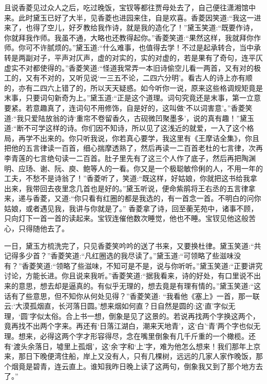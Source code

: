 \begin{parag}
    且说香菱见过众人之后，吃过晚饭，宝钗等都往贾母处去了，自己便往潇湘馆中来。此时黛玉已好了大半，见香菱也进园来住，自是欢喜。香菱因笑道:“我这一进来了，也得了空儿，好歹教给我作诗，就是我的造化了！”黛玉笑道:“既要作诗，你就拜我作师。我虽不通，大略也还教得起你。”香菱笑道:“果然这样，我就拜你作师。你可不许腻烦的。”黛玉道:“什么难事，也值得去学！不过是起承转合，当中承转是两副对子，平声对仄声，虚的对实的，实的对虚的，若是果有了奇句，连平仄虚实不对都使得的。”香菱笑道:“怪道我常弄一本旧诗偷空儿看一两首，又有对的极工的，又有不对的，又听见说‘一三五不论，二四六分明’。看古人的诗上亦有顺的，亦有二四六上错了的，所以天天疑惑。如今听你一说，原来这些格调规矩竟是末事，只要词句新奇为上。”黛玉道:“正是这个道理。词句究竟还是末事，第一立意要紧。若意趣真了，连词句不用修饰，自是好的，这叫做‘不以词害意’。”香菱笑道:“我只爱陆放翁的诗‘重帘不卷留香久，古砚微凹聚墨多’，说的真有趣！”黛玉道:“断不可学这样的诗。你们因不知诗，所以见了这浅近的就爱，一入了这个格局，再学不出来的。你只听我说，你若真心要学，我这里有《王摩诘全集》，你且把他的五言律读一百首，细心揣摩透熟了，然后再读一二百首老杜的七言律，次再李青莲的七言绝句读一二百首。肚子里先有了这三个人作了底子，然后再把陶渊明、应玚、谢、阮、庾、鲍等人的一看。你又是一个极聪敏伶俐的人，不用一年的工夫，不愁不是诗翁了！”香菱听了，笑道:“既这样，好姑娘，你就把这书给我拿出来，我带回去夜里念几首也是好的。”黛玉听说，便命紫鹃将王右丞的五言律拿来，递与香菱，又道:“你只看有红圈的都是我选的，有一首念一首。不明白的问你姑娘，或者遇见我，我讲与你就是了。” 香菱拿了诗，回至蘅芜苑中，诸事不顾，只向灯下一首一首的读起来。宝钗连催他数次睡觉，他也不睡。宝钗见他这般苦心，只得随他去了。
\end{parag}


\begin{parag}
    一日，黛玉方梳洗完了，只见香菱笑吟吟的送了书来，又要换杜律。黛玉笑道:“共记得多少首？”香菱笑道:“凡红圈选的我尽读了。”黛玉道:“可领略了些滋味没有？”香菱笑道:“领略了些滋味，不知可是不是，说与你听听。”黛玉笑道:“正要讲究讨论，方能长进。你且说来我听。”香菱笑道:“据我看来，诗的好处，有口里说不出来的意思，想去却是逼真的。有似乎无理的，想去竟是有理有情的。”黛玉笑道:“这话有了些意思，但不知你从何处见得？”香菱笑道: “我看他《塞上》一首，那一联云:‘大漠孤烟直，长河落日圆。’想来烟如何直？日自然是圆的:这‘直’字似无理，‘圆’字似太俗。合上书一想，倒象是见了这景的。若说再找两个字换这两个，竟再找不出两个字来。再还有‘日落江湖白，潮来天地青’，这‘白’‘青’两个字也似无理。想来，必得这两个字才形容得尽，念在嘴里倒象有几千斤重的一个橄榄。还有‘渡头余落日，墟里上孤烟’，这‘余’字和‘上’字，难为他怎么想来！我们那年上京来，那日下晚便湾住船，岸上又没有人，只有几棵树，远远的几家人家作晚饭，那个烟竟是碧青，连云直上。谁知我昨日晚上读了这两句，倒象我又到了那个地方去了。”
\end{parag}


